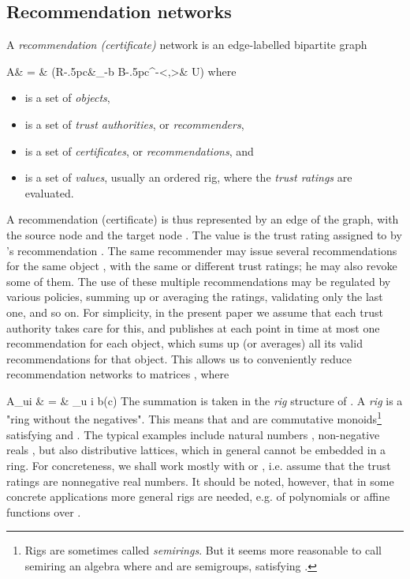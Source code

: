 \documentclass{llncs}
\makeatletter
\newcommand{\truss}[2]{\underset{#2}{\stackrel{#1}{\rightarrow}}}
\newcommand{\Obj}{{\sf J}}
\newcommand{\Atr}{{\sf U}}
\newcommand{\Rat}{{\sf R}}
\newcommand{\Bin}{{\sf B}}
\newcommand{\bind}{b}
\newcommand{\tto}[1]{\xymatrix@C-.5pc{\ar[r]^-{#1}&}}
\newcommand{\oot}[1]{\xymatrix@C-.5pc{&\ar[l]_-{#1}}}
\renewcommand{\Bbb}{\mathbb}
\newcommand{\AAa}{{\Bbb A}}
\newcommand{\bear}{}
\makeatother
\begin{document}
\subsection{Recommendation networks}\label{Recommendation}
A {\em recommendation (certificate)\/} network  is an edge-labelled bipartite graph  
\bear
\AAa   & = &  \big(\Rat \oot{\bind} \Bin \tto{<\partial,\varrho>} \Atr\times\Obj \big)
\eear
where 
\begin{itemize}
\item  is a set of {\em objects},
\item  is a set of  {\em trust authorities}, or {\em recommenders},
\item  is a set of {\em certificates}, or {\em recommendations}, and
\item  is a set of {\em values}, usually an ordered rig, where the {\em trust ratings} are evaluated.
\end{itemize}
A recommendation (certificate)  is thus represented by an edge  of the graph, with the source node  and the target node . The value  is the trust rating assigned to  by 's recommendation . The same recommender  may issue several recommendations   for the same object , with the same or different trust ratings; he may also revoke some of them. The use of these multiple recommendations may be regulated by various policies, summing up or averaging the ratings, validating only the last one, and so on. For simplicity, in the present paper we assume that each trust authority takes care for this, and publishes at each point in time at most one recommendation for each object, which sums up (or averages) all its valid recommendations for that object. This allows us to conveniently reduce recommendation networks to matrices , where 
\bear
A_{ui}  & = &  \sum_{u\truss{c}{} i} \bind(c)
\eear
The summation is taken in the {\em rig\/} structure of . A {\em rig\/}  is a "ring without the negatives". This means that  and  are commutative monoids\footnote{Rigs are sometimes called {\em semirings}. But it seems more reasonable to call semiring an algebra  where  and  are semigroups, satisfying .} satisfying  and . The typical examples include natural numbers , non-negative reals , but also distributive lattices, which in general cannot be embedded in a ring.  For concreteness, we shall work mostly with  or , i.e. assume that the trust ratings are nonnegative real numbers. 
It should be noted, however, that  in some concrete applications more general rigs are needed, e.g. of polynomials or affine functions over .
\end{document}
